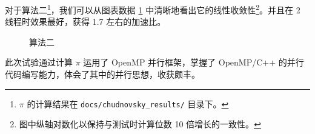 \documentclass{zjureport-zh}
\begin{document}
\par 对于算法二\footnote{$\pi$ 的计算结果在 \texttt{docs/chudnovsky\_results/} 目录下。}，我们可以从图表数据 \ref{fig2} 中清晰地看出它的线性收敛性\footnote{图中纵轴对数化以保持与测试时计算位数 10 倍增长的一致性。}。并且在 2 线程时效果最好，获得 1.7 左右的加速比。

\begin{figure}[h] \label{fig2}
	\centering
	\caption{算法二}
\end{figure}

\par 此次试验通过计算 $\pi$ 运用了 OpenMP 并行框架，掌握了 OpenMP/C++ 的并行代码编写能力，体会了其中的并行思想，收获颇丰。



\end{document}
